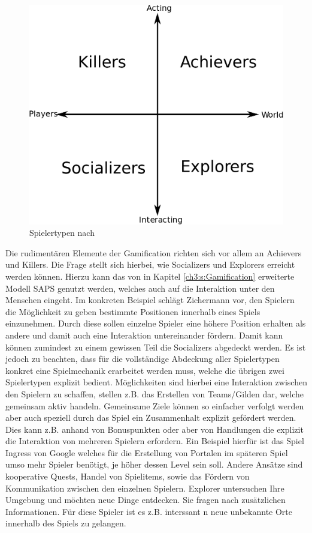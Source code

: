 \begin{figure}[H]
\begin{center}
\includegraphics[width=120mm]{images/ch4_img01_playertypes.png}
\caption{Spielertypen nach \textcite{Bartle.2004}}
\label{img:ch03_img02_flow}
\end{center}
\end{figure}

Die rudimentären Elemente der Gamification richten sich vor allem an Achievers und Killers.
Die Frage stellt sich hierbei, wie Socializers und Explorers erreicht werden können.
Hierzu kann das von \cite{Zichermann.2011} in Kapitel \ref{ch3:s:Gamification} erweiterte Modell SAPS genutzt werden, welches auch auf die Interaktion unter den Menschen eingeht. Im konkreten Beispiel schlägt Zichermann vor, den Spielern die Möglichkeit zu geben bestimmte Positionen innerhalb eines Spiels einzunehmen. Durch diese sollen einzelne Spieler eine höhere Position erhalten als andere und damit auch eine Interaktion untereinander fördern. Damit kann können zumindest zu einem gewissen Teil die Socializers abgedeckt werden.
Es ist jedoch zu beachten, dass für die vollständige Abdeckung aller Spielertypen konkret eine Spielmechanik erarbeitet werden muss, welche die übrigen zwei Spielertypen explizit bedient. Möglichkeiten sind hierbei eine Interaktion zwischen den Spielern zu schaffen, stellen z.B. das Erstellen von Teams/Gilden dar, welche gemeinsam aktiv handeln. Gemeinsame Ziele können so einfacher verfolgt werden aber auch speziell durch das Spiel ein Zusammenhalt explizit gefördert werden. Dies kann z.B. anhand von Bonuspunkten oder aber von Handlungen die explizit die Interaktion von mehreren Spielern erfordern. Ein Beispiel hierfür ist das Spiel Ingress von Google welches für die Erstellung von Portalen im späteren Spiel umso mehr Spieler benötigt, je höher dessen Level sein soll. \cite{Celino.2013}
Andere Ansätze sind kooperative Quests, Handel von Spielitems, sowie das Fördern von Kommunikation zwischen den einzelnen Spielern. \cite{Caon.2013}
Explorer untersuchen Ihre Umgebung und möchten neue Dinge entdecken. Sie fragen nach zusätzlichen Informationen. Für diese Spieler ist es z.B. interssant n neue unbekannte Orte innerhalb des Spiels zu gelangen.


